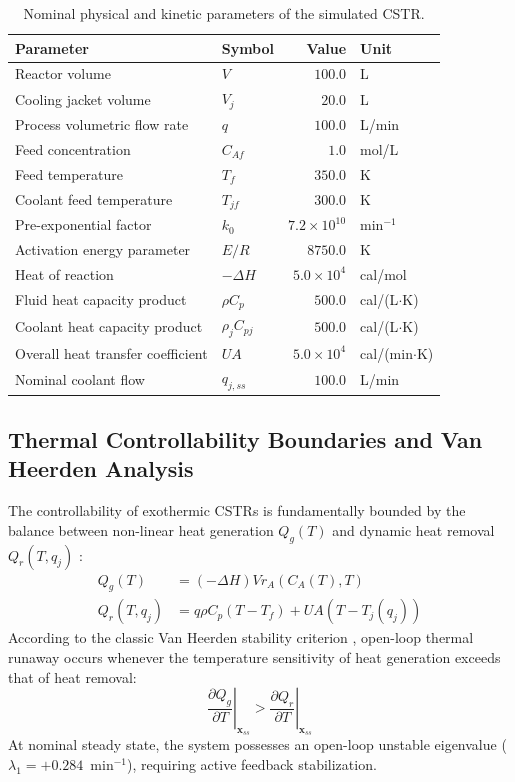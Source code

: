 \begin{table}[htbp]
\centering
\caption{Nominal physical and kinetic parameters of the simulated CSTR.}
\label{tab:cstr_parameters}
\begin{tabular}{llrl}
\toprule
Parameter & Symbol & Value & Unit \\
\midrule
Reactor volume & $V$ & $100.0$ & L \\
Cooling jacket volume & $V_j$ & $20.0$ & L \\
Process volumetric flow rate & $q$ & $100.0$ & L/min \\
Feed concentration & $C_{Af}$ & $1.0$ & mol/L \\
Feed temperature & $T_f$ & $350.0$ & K \\
Coolant feed temperature & $T_{jf}$ & $300.0$ & K \\
Pre-exponential factor & $k_0$ & $7.2 \times 10^{10}$ & min$^{-1}$ \\
Activation energy parameter & $E/R$ & $8750.0$ & K \\
Heat of reaction & $-\Delta H$ & $5.0 \times 10^4$ & cal/mol \\
Fluid heat capacity product & $\rho C_p$ & $500.0$ & cal/(L$\cdot$K) \\
Coolant heat capacity product & $\rho_j C_{pj}$ & $500.0$ & cal/(L$\cdot$K) \\
Overall heat transfer coefficient & $UA$ & $5.0 \times 10^4$ & cal/(min$\cdot$K) \\
Nominal coolant flow & $q_{j,ss}$ & $100.0$ & L/min \\
\bottomrule
\end{tabular}
\end{table}

\subsection{Thermal Controllability Boundaries and Van Heerden Analysis}
\label{subsec:thermal_controllability}
The controllability of exothermic CSTRs is fundamentally bounded by the balance between non-linear heat generation $Q_g(T)$ and dynamic heat removal $Q_r(T, q_j)$ \cite{aris1958analysis, uppal1974dynamic}:
\begin{align}
    Q_g(T) &= (-\Delta H) V r_A(C_A(T), T) \label{eq:q_gen} \\
    Q_r(T, q_j) &= q \rho C_p (T - T_f) + UA (T - T_j(q_j)) \label{eq:q_rem}
\end{align}
According to the classic Van Heerden stability criterion \cite{seborg2010process, bequette2003process}, open-loop thermal runaway occurs whenever the temperature sensitivity of heat generation exceeds that of heat removal:
\begin{equation}
    \left. \frac{\partial Q_g}{\partial T} \right|_{\mathbf{x}_{ss}} > \left. \frac{\partial Q_r}{\partial T} \right|_{\mathbf{x}_{ss}}
    \label{eq:van_heerden}
\end{equation}
At nominal steady state, the system possesses an open-loop unstable eigenvalue ($\lambda_1 = +0.284$~min$^{-1}$), requiring active feedback stabilization.


